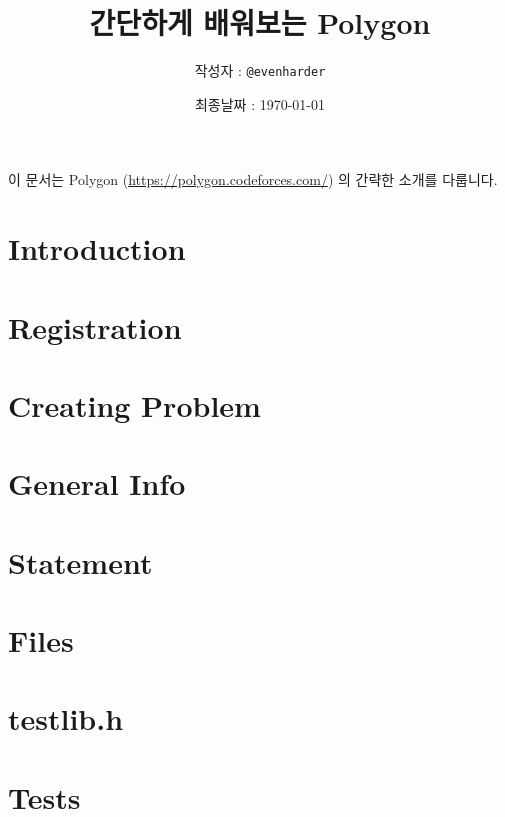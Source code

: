 \documentclass{article}
\title{간단하게 배워보는 Polygon}
\author{작성자 : \texttt{@evenharder}}
\date{최종날짜 : \today}
\begin{document}
    \maketitle
    이 문서는 Polygon (\url{https://polygon.codeforces.com/}) 의 간략한 소개를 다룹니다.
    \tableofcontents
    \newpage
    \section{Introduction}
    
    \section{Registration}
    
    \section{Creating Problem}
    
    \section{General Info}
    
    \section{Statement}
    
    \section{Files}
    
    \section{testlib.h}
    
    \section{Tests}
    
\end{document}
